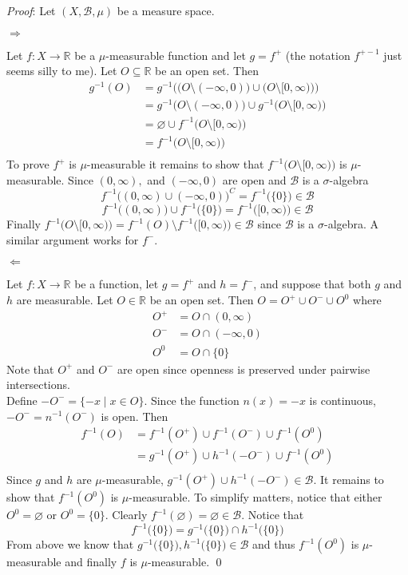 \documentclass[12pt]{article}
\let\emptyset\varnothing
\renewenvironment{proof}{\hspace{-4 ex} \emph{Proof}:}{\qed}
\newcommand{\RR}{\mathbb{R}}
\newcommand{\BB}{\mathcal{B}}
\begin{document}
\begin{proof}
	Let $(X, \BB,\mu)$ be a measure space.
	
	$\Longrightarrow$
	
	Let $f: X \to \RR$ be a $\mu$-measurable function and let $g = f^+$ (the notation $f^{+-1}$ just seems silly to me). Let $O \subseteq \RR$ be an open set. Then 
	\begin{align*}
		g^{-1}(O) & = g^{-1}\Big( \big( O \setminus (-\infty,0) \big) \cup \big( O \setminus [0, \infty) \big) \Big) \\
		& = g^{-1} \big( O \setminus (-\infty,0) \big) \cup g^{-1} \big( O \setminus [0, \infty) \big) \\
		& = \emptyset \cup f^{-1} \big( O \setminus [0, \infty) \big) \\
		& = f^{-1} \big( O \setminus [0, \infty) \big) \\
	\end{align*}
	To prove $f^+$ is $\mu$-measurable it remains to show that $f^{-1} \big( O \setminus [0, \infty) \big)$ is $\mu$-measurable.
	Since $(0, \infty),$ and $(-\infty, 0)$ are open and $\BB$ is a $\sigma$-algebra
	$$
	f^{-1} \big( (0, \infty) \cup (-\infty, 0) \big)^C = f^{-1} \big( \{0\} \big ) \in \BB
	$$
	$$
	f^{-1} \big( (0, \infty) \big) \cup f^{-1} \big( \{0\} \big ) = f^{-1} \big( [0, \infty) \big) \in \BB
	$$
	Finally $f^{-1} \big( O \setminus [0, \infty) \big) = f^{-1}(O) \setminus f^{-1} \big( [0, \infty) \big) \in \BB$ since $\BB$ is a $\sigma$-algebra. A similar argument works for $f^-$.
	
	\bigbreak $\Longleftarrow$
	
	Let $f: X \to \RR$ be a function, let $g = f^+$ and $h= f^-$, and suppose that both $g$ and $h$ are measurable. Let $O \in \RR$ be an open set. Then $O = O^+ \cup O^- \cup O^0$ where
	\begin{align*}
		O^+ & = O \cap (0,\infty) \\
		O^- & = O \cap (-\infty, 0) \\
		O^0 & = O \cap \{0\}
	\end{align*}
	Note that $O^+$ and $O^-$ are open since openness is preserved under pairwise intersections.\\
	Define $-O^- = \{-x \mid x\in O\}$. Since the function $n(x) = -x$ is continuous, $-O^- = n^{-1}(O^-)$ is open. Then
	\begin{align*}
		f^{-1}(O) & = f^{-1}(O^+) \cup f^{-1}(O^-) \cup f^{-1}(O^0) \\
		& = g^{-1}(O^+) \cup h^{-1}(-O^-) \cup f^{-1}(O^0) \\
	\end{align*}
	Since $g$ and $h$ are $\mu$-measurable, $g^{-1}(O^+) \cup h^{-1}(-O^-) \in \BB$. It remains to show that $f^{-1}(O^0)$ is $\mu$-measurable. To simplify matters, notice that either $O^0 = \emptyset$ or $O^0 = \{0\}$. Clearly $f^{-1}(\emptyset) = \emptyset \in \BB$. Notice that 
	$$
	f^{-1}\big ( \{0\} \big ) = g^{-1}\big ( \{0\} \big ) \cap h^{-1}\big ( \{0\} \big )
	$$
	From above we know that $g^{-1}\big ( \{0\} \big ), h^{-1}\big ( \{0\} \big ) \in \BB$ and thus $f^{-1}(O^0)$ is $\mu$-measurable and finally $f$ is $\mu$-measurable.	
\end{proof}
\end{document}
